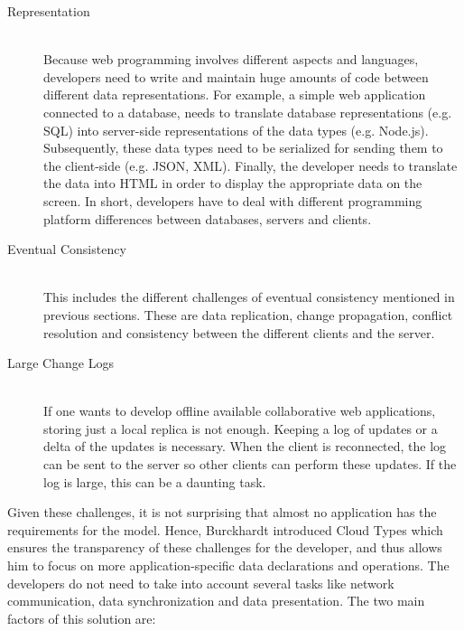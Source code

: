 \documentclass[a4paper,12pt]{report}
\begin{document}
\begin{description}
    \item[Representation] \hfill \\Because web programming involves different aspects and languages, developers need to write and maintain huge amounts of code between different data representations. For example, a simple web application connected to a database, needs to translate database representations (e.g. SQL) into server-side representations of the data types (e.g. Node.js). Subsequently, these data types need to be serialized for sending them to the client-side (e.g. JSON, XML). Finally, the developer needs to translate the data into HTML in order to display the appropriate data on the screen. In short, developers have to deal with different programming platform differences between databases, servers and clients. 
    \item[Eventual Consistency] \hfill \\This includes the different challenges of eventual consistency mentioned in previous sections. These are data replication, change propagation, conflict resolution and consistency between the different clients and the server.
    \item[Large Change Logs] \hfill \\If one wants to develop offline available collaborative web applications, storing just a local replica is not enough. Keeping a log of updates or a delta of the updates is necessary. When the client is reconnected, the log can be sent to the server so other clients can perform these updates. If the log is large, this can be a daunting task.
\end{description}

Given these challenges, it is not surprising that almost no application has the requirements for the model. Hence, Burckhardt introduced Cloud Types which ensures the transparency of these challenges for the developer, and thus allows him to focus on more application-specific data declarations and operations. The developers do not need to take into account several tasks like network communication, data synchronization and data presentation. The two main factors of this solution are:
\end{document}
